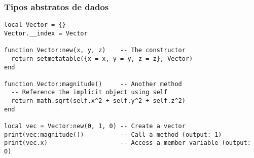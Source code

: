 \begin{frame}[fragile]
  \frametitle{Tipos abstratos de dados}
  \begin{block}{}
  \begin{lstlisting}
local Vector = {}
Vector.__index = Vector
 
function Vector:new(x, y, z)    -- The constructor
  return setmetatable({x = x, y = y, z = z}, Vector)
end
 
function Vector:magnitude()     -- Another method
  -- Reference the implicit object using self
  return math.sqrt(self.x^2 + self.y^2 + self.z^2)
end
 
local vec = Vector:new(0, 1, 0) -- Create a vector
print(vec:magnitude())          -- Call a method (output: 1)
print(vec.x)                    -- Access a member variable (output: 0)
  \end{lstlisting}
  \end{block}
\end{frame}
